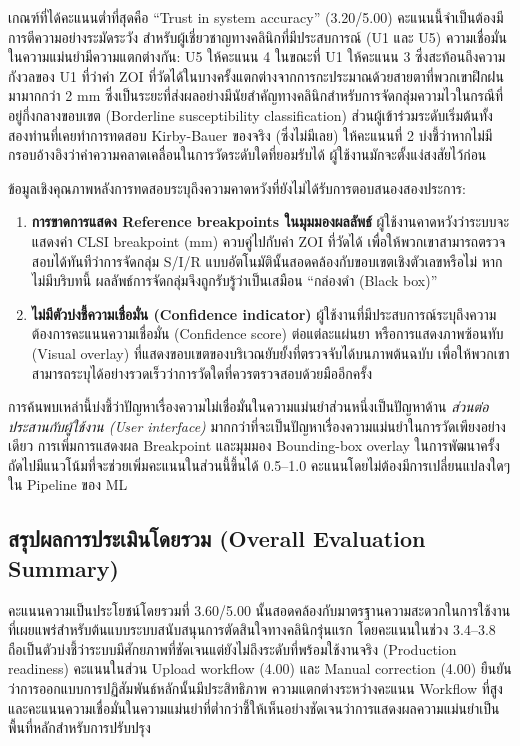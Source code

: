 เกณฑ์ที่ได้คะแนนต่ำที่สุดคือ ``Trust in system accuracy'' (3.20/5.00) คะแนนนี้จำเป็นต้องมีการตีความอย่างระมัดระวัง สำหรับผู้เชี่ยวชาญทางคลินิกที่มีประสบการณ์ (U1 และ U5) ความเชื่อมั่นในความแม่นยำมีความแตกต่างกัน: U5 ให้คะแนน 4 ในขณะที่ U1 ให้คะแนน 3 ซึ่งสะท้อนถึงความกังวลของ U1 ที่ว่าค่า ZOI ที่วัดได้ในบางครั้งแตกต่างจากการกะประมาณด้วยสายตาที่พวกเขาฝึกฝนมามากกว่า 2 mm ซึ่งเป็นระยะที่ส่งผลอย่างมีนัยสำคัญทางคลินิกสำหรับการจัดกลุ่มความไวในกรณีที่อยู่กึ่งกลางขอบเขต (Borderline susceptibility classification) ส่วนผู้เข้าร่วมระดับเริ่มต้นทั้งสองท่านที่เคยทำการทดสอบ Kirby-Bauer ของจริง (ซึ่งไม่มีเลย) ให้คะแนนที่ 2 บ่งชี้ว่าหากไม่มีกรอบอ้างอิงว่าค่าความคลาดเคลื่อนในการวัดระดับใดที่ยอมรับได้ ผู้ใช้งานมักจะตั้งแง่สงสัยไว้ก่อน

ข้อมูลเชิงคุณภาพหลังการทดสอบระบุถึงความคาดหวังที่ยังไม่ได้รับการตอบสนองสองประการ:
\begin{enumerate}
  \item \textbf{การขาดการแสดง Reference breakpoints ในมุมมองผลลัพธ์}
        ผู้ใช้งานคาดหวังว่าระบบจะแสดงค่า CLSI breakpoint (mm) ควบคู่ไปกับค่า ZOI ที่วัดได้ เพื่อให้พวกเขาสามารถตรวจสอบได้ทันทีว่าการจัดกลุ่ม S/I/R แบบอัตโนมัตินั้นสอดคล้องกับขอบเขตเชิงตัวเลขหรือไม่ หากไม่มีบริบทนี้ ผลลัพธ์การจัดกลุ่มจึงถูกรับรู้ว่าเป็นเสมือน ``กล่องดำ (Black box)''
  \item \textbf{ไม่มีตัวบ่งชี้ความเชื่อมั่น (Confidence indicator)}
        ผู้ใช้งานที่มีประสบการณ์ระบุถึงความต้องการคะแนนความเชื่อมั่น (Confidence score) ต่อแต่ละแผ่นยา หรือการแสดงภาพซ้อนทับ (Visual overlay) ที่แสดงขอบเขตของบริเวณยับยั้งที่ตรวจจับได้บนภาพต้นฉบับ เพื่อให้พวกเขาสามารถระบุได้อย่างรวดเร็วว่าการวัดใดที่ควรตรวจสอบด้วยมืออีกครั้ง
\end{enumerate}

การค้นพบเหล่านี้บ่งชี้ว่าปัญหาเรื่องความไม่เชื่อมั่นในความแม่นยำส่วนหนึ่งเป็นปัญหาด้าน \emph{ส่วนต่อประสานกับผู้ใช้งาน (User interface)} มากกว่าที่จะเป็นปัญหาเรื่องความแม่นยำในการวัดเพียงอย่างเดียว การเพิ่มการแสดงผล Breakpoint และมุมมอง Bounding-box overlay ในการพัฒนาครั้งถัดไปมีแนวโน้มที่จะช่วยเพิ่มคะแนนในส่วนนี้ขึ้นได้ 0.5--1.0 คะแนนโดยไม่ต้องมีการเปลี่ยนแปลงใดๆ ใน Pipeline ของ ML

\subsection{สรุปผลการประเมินโดยรวม (Overall Evaluation Summary)}

คะแนนความเป็นประโยชน์โดยรวมที่ 3.60/5.00 นั้นสอดคล้องกับมาตรฐานความสะดวกในการใช้งานที่เผยแพร่สำหรับต้นแบบระบบสนับสนุนการตัดสินใจทางคลินิกรุ่นแรก โดยคะแนนในช่วง 3.4--3.8 ถือเป็นตัวบ่งชี้ว่าระบบมีศักยภาพที่ชัดเจนแต่ยังไม่ถึงระดับที่พร้อมใช้งานจริง (Production readiness) \cite{rajasekar2023} คะแนนในส่วน Upload workflow (4.00) และ Manual correction (4.00) ยืนยันว่าการออกแบบการปฏิสัมพันธ์หลักนั้นมีประสิทธิภาพ ความแตกต่างระหว่างคะแนน Workflow ที่สูงและคะแนนความเชื่อมั่นในความแม่นยำที่ต่ำกว่าชี้ให้เห็นอย่างชัดเจนว่าการแสดงผลความแม่นยำเป็นพื้นที่หลักสำหรับการปรับปรุง

